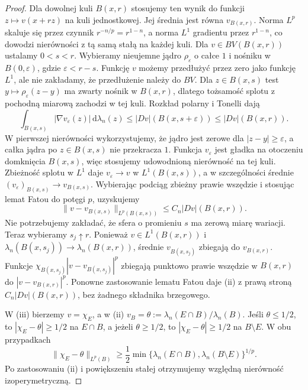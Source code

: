\begin{proof}
Dla dowolnej kuli $B(x,r)$ stosujemy ten wynik
do funkcji $z\mapsto v(x+rz)$ na kuli jednostkowej.
Jej średnia jest równa $v_{B(x,r)}$. Norma $L^p$
skaluje się przez czynnik $r^{-n/p}=r^{1-n}$,
a norma $L^1$ gradientu przez $r^{1-n}$, co
dowodzi nierówności z tą samą stałą na każdej kuli. Dla $v\in BV(B(x,r))$ ustalamy $0<s<r$.
Wybieramy nieujemne jądro $\rho_\varepsilon$
o całce $1$ i nośniku w $B(0,\varepsilon)$,
gdzie $\varepsilon<r-s$. Funkcję $v$ możemy
przedłużyć przez zero jako funkcję $L^1$,
ale nie zakładamy, że przedłużenie należy do $BV$.
Dla $z\in B(x,s)$ test
$y\mapsto\rho_\varepsilon(z-y)$ ma zwarty
nośnik w $B(x,r)$, dlatego tożsamość splotu
z pochodną miarową zachodzi w tej kuli.
Rozkład polarny i Tonelli dają
\[
 \int_{B(x,s)}|\nabla v_\varepsilon(z)|\,\mathrm d\lambda_n(z)
 \le |Dv|(B(x,s+\varepsilon))
 \le |Dv|(B(x,r)).
\]
W pierwszej nierówności wykorzystujemy, że jądro
jest zerowe dla $|z-y|\ge\varepsilon$, a całka
jądra po $z\in B(x,s)$ nie przekracza $1$.
Funkcja $v_\varepsilon$ jest gładka na otoczeniu
domknięcia $B(x,s)$, więc stosujemy udowodnioną
nierówność na tej kuli. Zbieżność splotu w $L^1$
daje $v_\varepsilon\to v$ w $L^1(B(x,s))$,
a w szczególności średnie
$(v_\varepsilon)_{B(x,s)}\to v_{B(x,s)}$.
Wybierając podciąg zbieżny prawie wszędzie i
stosując lemat Fatou do potęgi $p$, uzyskujemy
\[
 \|v-v_{B(x,s)}\|_{L^p(B(x,s))}
 \le C_n|Dv|(B(x,r)).
\]
Nie potrzebujemy zakładać, że sfera o promieniu
$s$ ma zerową miarę wariacji.
Teraz wybieramy $s_j\uparrow r$.
Ponieważ $v\in L^1(B(x,r))$ i
$\lambda_n(B(x,s_j))\to\lambda_n(B(x,r))$,
średnie $v_{B(x,s_j)}$ zbiegają do $v_{B(x,r)}$.
Funkcje
$\chi_{B(x,s_j)}|v-v_{B(x,s_j)}|^p$ zbiegają
punktowo prawie wszędzie w $B(x,r)$ do
$|v-v_{B(x,r)}|^p$. Ponowne zastosowanie lematu
Fatou daje (ii) z prawą stroną
$C_n|Dv|(B(x,r))$, bez żadnego składnika brzegowego.

W (iii) bierzemy $v=\chi_E$, a w (ii)
$v_B=\theta:=\lambda_n(E\cap B)/\lambda_n(B)$.
Jeśli $\theta\le1/2$, to $|\chi_E-\theta|\ge1/2$
na $E\cap B$, a jeżeli $\theta\ge1/2$, to
$|\chi_E-\theta|\ge1/2$ na $B\setminus E$.
W obu przypadkach
\[
 \|\chi_E-\theta\|_{L^p(B)}
 \ge\frac12\min\{\lambda_n(E\cap B),
                   \lambda_n(B\setminus E)\}^{1/p}.
\]
Po zastosowaniu (ii) i powiększeniu stałej
otrzymujemy względną nierówność izoperymetryczną.


\end{proof}

